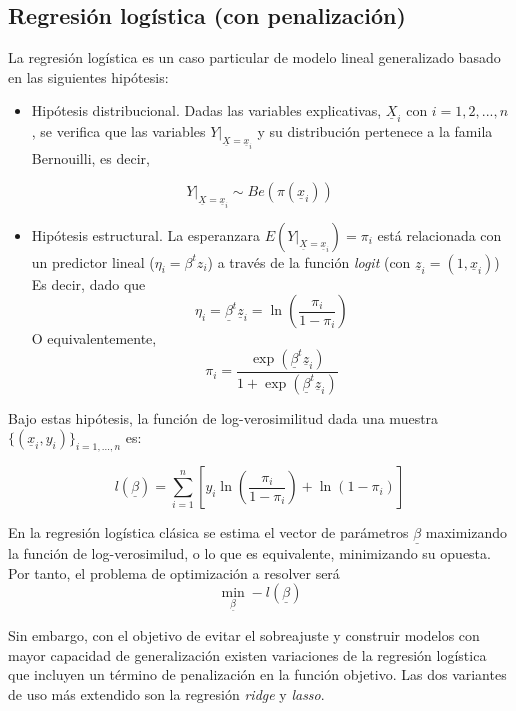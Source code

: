 \documentclass[12pt,a4paper,]{book}
\providecommand{\tightlist}{%
  \setlength{\itemsep}{0pt}\setlength{\parskip}{0pt}}
\numberwithin{dummy}{section}
\theoremstyle{ocrenumbox}
\theoremstyle{blacknumex}
\theoremstyle{blacknumbox}
\theoremstyle{ocrenum}
\theoremstyle{ocrenum}
\begin{document}
\hypertarget{regresiuxf3n-loguxedstica-con-penalizaciuxf3n}{%
\subsection{Regresión logística (con
penalización)}\label{regresiuxf3n-loguxedstica-con-penalizaciuxf3n}}

La regresión logística es un caso particular de modelo lineal
generalizado basado en las siguientes hipótesis:

\begin{itemize}
\tightlist
\item
  Hipótesis distribucional. Dadas las variables explicativas,
  \(\underline X_i\) con \(i = 1,2,...,n\), se verifica que las
  variables \(Y|_{\underline X= \underline x_i}\) y su distribución
  pertenece a la famila Bernouilli, es decir,
\end{itemize}

\[Y|_{\underline X= \underline x_i} \sim Be(\pi( \underline x_i))\]

\begin{itemize}
\tightlist
\item
  Hipótesis estructural. La esperanzara
  \(E(Y|_{\underline X= \underline x_i}) = \pi_i\) está relacionada con
  un predictor lineal (\(\eta_i = \beta^t z_i\)) a través de la función
  \emph{logit} (con \(\underline z_i = \left(1,\underline x_i\right)\))
  Es decir, dado que
  \[\eta_i = \underline \beta^t \underline z_i= \ln(\frac{\pi_i}{1-\pi_i})\]
  O equivalentemente,
  \[\pi_i = \frac{\exp(\underline \beta^t \underline z_i)}{1 + \exp(\underline \beta^t \underline z_i)}\]
\end{itemize}

Bajo estas hipótesis, la función de log-verosimilitud dada una muestra
\(\{ (\underline x_i,y_i) \}_{i=1,...,n}\) es:

\[ l(\underline \beta) = 
\sum_{i=1}^n \left[ 
y_i\ln \left( \frac{\pi_i}{1-\pi_i} \right) + 
\ln \left( 1 - \pi_i\right) \right]\]

En la regresión logística clásica se estima el vector de parámetros
\(\underline \beta\) maximizando la función de log-verosimilud, o lo que
es equivalente, minimizando su opuesta. Por tanto, el problema de
optimización a resolver será
\[\min_{\underline \beta} -l(\underline \beta)\]

Sin embargo, con el objetivo de evitar el sobreajuste y construir
modelos con mayor capacidad de generalización existen variaciones de la
regresión logística que incluyen un término de penalización en la
función objetivo. Las dos variantes de uso más extendido son la
regresión \emph{ridge} y \emph{lasso}.
\end{document}
